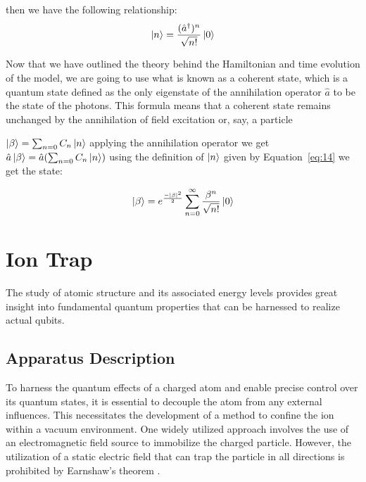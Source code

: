 \documentclass[
  journal=largetwo,
  year=2023,
]{cup-journal}
\begin{document}
then we have the following relationship:
\begin{equation}
  \begin{aligned}\label{eq:14}
    \ket{n} = \frac{(\hat{a}^{\dag})^n}{\sqrt{n!}}\ket{0}
  \end{aligned}
\end{equation}


Now that we have outlined the theory behind the Hamiltonian and time evolution of the model, we are going to use what is known as a coherent state, which is a quantum state defined as the only eigenstate of the annihilation operator \(\hat{a}\) to be the state of the photons. This formula means that a coherent state remains unchanged by the annihilation of field excitation or, say, a particle

\(\ket{\beta} = \sum_{n=0}{C_n \ket{n}}\) applying the annihilation operator we get \(\hat{a}\ket{\beta} = \hat{a}(\sum_{n=0}{C_n \ket{n}})\) using the definition of \(\ket{n}\) given by Equation~\ref{eq:14} we get the state:

\begin{equation}
  \begin{aligned}\label{eq:15}
    \ket{\beta} = e^{\frac{-|\beta|^2}{2}}\sum_{n=0}^{\infty}{\frac{\beta^n}{\sqrt{n!}}\ket{0}}
  \end{aligned}
\end{equation}


\section{Ion Trap}
\label{cap:ion}
The study of atomic structure and its associated energy levels provides great insight into fundamental quantum properties that can be harnessed to realize actual qubits.

\subsection{Apparatus Description}
\label{sec:apparatus_description}

To harness the quantum effects of a charged atom and enable precise control over its quantum states, it is essential to decouple the atom from any external influences. This necessitates the development of a method to confine the ion within a vacuum environment. One widely utilized approach involves the use of an electromagnetic field source to immobilize the charged particle. However, the utilization of a static electric field that can trap the particle in all directions is prohibited by Earnshaw's theorem \autocite{jones_1980_earnshaws}.
\end{document}

